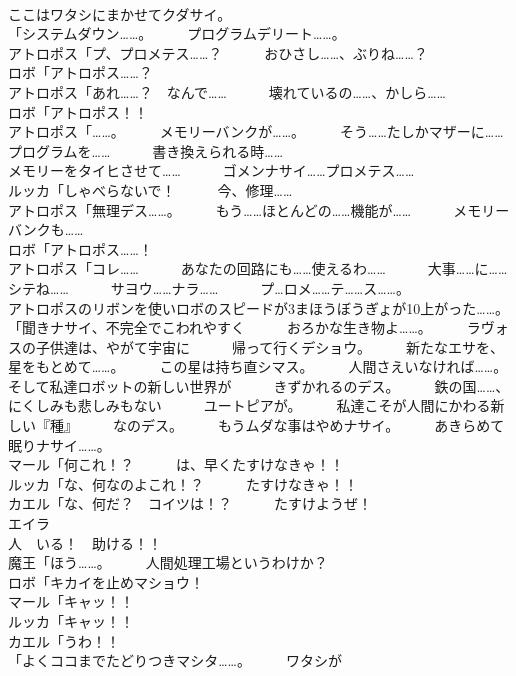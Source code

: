 \documentclass[8pt]{extreport}
\begin{document}
\begin{CJK}{UTF8}{min}
\\	ここはワタシにまかせてクダサイ。	
\\	「システムダウン……。　　　プログラムデリート……。	
\\	アトロポス「プ、プロメテス……？　　　おひさし……、ぶりね……？	
\\	ロボ「アトロポス……？	
\\	アトロポス「あれ……？　なんで……　　　壊れているの……、かしら……	
\\	ロボ「アトロポス！！	
\\	アトロポス「……。　　　メモリーバンクが……。　　　そう……たしかマザーに……　　　プログラムを……　　　書き換えられる時……	
\\	メモリーをタイヒさせて……　　　ゴメンナサイ……プロメテス……	
\\	ルッカ「しゃべらないで！　　　今、修理……	
\\	アトロポス「無理デス……。　　　もう……ほとんどの……機能が……　　　メモリーバンクも……	
\\	ロボ「アトロポス……！	
\\	アトロポス「コレ……　　　あなたの回路にも……使えるわ……　　　大事……に……シテね……　　　サヨウ……ナラ……　　　プ…ロメ……テ……ス……。	
\\	アトロポスのリボンを使いロボのスピードが3まほうぼうぎょが10上がった……。	
\\	「聞きナサイ、不完全でこわれやすく　　　おろかな生き物よ……。　　　ラヴォスの子供達は、やがて宇宙に　　　帰って行くデショウ。　　　新たなエサを、星をもとめて……。　　　この星は持ち直シマス。　　　人間さえいなければ……。　　　そして私達ロボットの新しい世界が　　　きずかれるのデス。　　　鉄の国……、にくしみも悲しみもない　　　ユートピアが。　　　私達こそが人間にかわる新しい『種』　　　なのデス。　　　もうムダな事はやめナサイ。　　　あきらめて眠りナサイ……。	
\\	マール「何これ！？　　　は、早くたすけなきゃ！！	
\\	ルッカ「な、何なのよこれ！？　　　たすけなきゃ！！	
\\	カエル「な、何だ？　コイツは！？　　　たすけようぜ！	
\\	エイラ
\\	人　いる！　助ける！！	
\\	魔王「ほう……。　　　人間処理工場というわけか？	
\\	ロボ「キカイを止めマショウ！	
\\	マール「キャッ！！	
\\	ルッカ「キャッ！！	
\\	カエル「うわ！！	
\\	「よくココまでたどりつきマシタ……。　　　ワタシが

\end{CJK}
\end{document}
